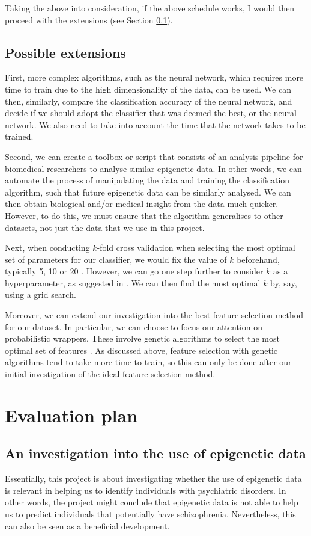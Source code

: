 \documentclass[12pt, twoside, a4paper]{article}
\begin{document}
Taking the above into consideration, if the above schedule works, I would then proceed with the extensions (see Section \ref{extensions}).

\subsection{Possible extensions} \label{extensions}
First, more complex algorithms, such as the neural network, which requires more time to train due to the high dimensionality of the data, can be used. We can then, similarly, compare the classification accuracy of the neural network, and decide if we should adopt the classifier that was deemed the best, or the neural network. We also need to take into account the time that the network takes to be trained.

Second, we can create a toolbox or script that consists of an analysis pipeline for biomedical researchers to analyse similar epigenetic data. In other words, we can automate the process of manipulating the data and training the classification algorithm, such that future epigenetic data can be similarly analysed. We can then obtain biological and/or medical insight from the data much quicker. However, to do this, we must ensure that the algorithm generalises to other datasets, not just the data that we use in this project.

Next, when conducting $k$-fold cross validation when selecting the most optimal set of parameters for our classifier, we would fix the value of $k$ beforehand, typically 5, 10 or 20 \cite{RefWorks:116}. However, we can go one step further to consider $k$ as a hyperparameter, as suggested in \cite{RefWorks:116}. We can then find the most optimal $k$ by, say, using a grid search.

Moreover, we can extend our investigation into the best feature selection method for our dataset. In particular, we can choose to focus our attention on probabilistic wrappers. These involve genetic algorithms to select the most optimal set of features \cite{RefWorks:118}. As discussed above, feature selection with genetic algorithms tend to take more time to train, so this can only be done after our initial investigation of the ideal feature selection method.

\section{Evaluation plan}
\subsection{An investigation into the use of epigenetic data}
Essentially, this project is about investigating whether the use of epigenetic data is relevant in helping us to identify individuals with psychiatric disorders. In other words, the project might conclude that epigenetic data is not able to help us to predict individuals that potentially have schizophrenia. Nevertheless, this can also be seen as a beneficial development.
\end{document}
